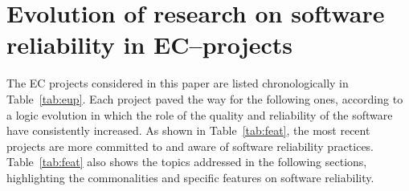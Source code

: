 \documentclass[journal]{IEEEtran}
\begin{document}
\section{Evolution of research on software reliability in EC--projects}
\label{sec:ev}

The EC projects considered in this paper are listed chronologically in Table~\ref{tab:eup}.
Each project paved the way for the following ones, according to a logic evolution in which
the role of the quality and reliability of the software have
consistently increased. As shown in Table~\ref{tab:feat}, the most recent projects are more
committed to and aware of software reliability practices.
Table~\ref{tab:feat} also shows the topics addressed in the following sections, highlighting
the commonalities and specific features on software reliability.
\end{document}
